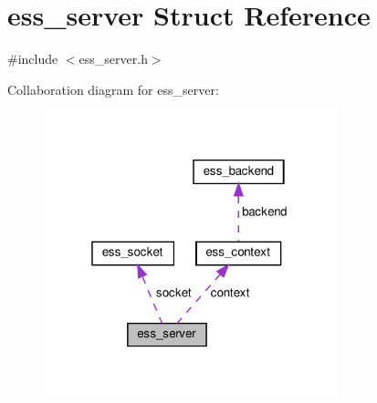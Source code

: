 \hypertarget{structess__server}{}\section{ess\+\_\+server Struct Reference}
\label{structess__server}


{\ttfamily \#include $<$ess\+\_\+server.\+h$>$}



Collaboration diagram for ess\+\_\+server\+:
\nopagebreak
\begin{figure}[H]
\begin{center}
\leavevmode
\includegraphics[width=241pt]{d0/d53/structess__server__coll__graph}
\end{center}
\end{figure}

